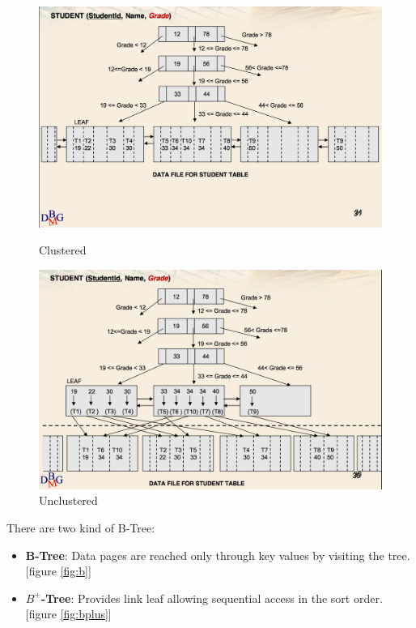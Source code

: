 \documentclass[12pt]{article}
\begin{document}
\begin{figure}[!hbpt]
  \centering
  \begin{minipage}{.45\textwidth}
    \centering
    \includegraphics[width=\linewidth]{images/clu.png}
    \caption{Clustered}
    \label{fig:clu}
  \end{minipage}\hfill
  \begin{minipage}{.45\textwidth}
    \centering
    \includegraphics[width=\linewidth]{images/unclu.png}
    \caption{Unclustered}
    \label{fig:unclu}
  \end{minipage}\hfill
\end{figure}
There are two kind of B-Tree:
\begin{itemize}
  \item \textbf{B-Tree}: Data pages are reached only through key values by visiting the tree. [figure \ref{fig:b}]
  \item \textbf{$B^{+}$-Tree}: Provides link leaf allowing sequential access in the sort order. [figure \ref{fig:bplus}]
\end{itemize}
\end{document}
